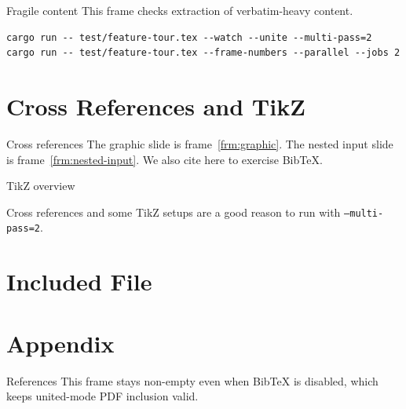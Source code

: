\documentclass[aspectratio=169]{beamer}
\begin{document}
\begin{frame}[fragile]{Fragile content}
This frame checks extraction of verbatim-heavy content.

\begin{verbatim}
cargo run -- test/feature-tour.tex --watch --unite --multi-pass=2
cargo run -- test/feature-tour.tex --frame-numbers --parallel --jobs 2
\end{verbatim}
\end{frame}

\section{Cross References and TikZ}

\begin{frame}{Cross references}
The graphic slide is frame~\ref{frm:graphic}.
The nested input slide is frame~\ref{frm:nested-input}.
We also cite \cite{knuth1984texbook} here to exercise BibTeX.
\end{frame}

\begin{frame}{TikZ overview}
  \centering

  \vspace{1em}
  Cross references and some TikZ setups are a good reason to run with \texttt{--multi-pass=2}.
\end{frame}

\section{Included File}



\appendix
\section{Appendix}



\begin{frame}[allowframebreaks]{References}
  This frame stays non-empty even when BibTeX is disabled, which keeps united-mode PDF inclusion valid.

  
  
\end{frame}
\end{document}
